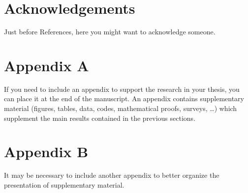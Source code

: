 \documentclass[11pt,a4paper]{article}
\begin{document}
\section*{Acknowledgements}
Just before References, here you might want to acknowledge someone.



\appendix
\section{Appendix A}
If you need to include an appendix to support the research in your thesis, you can place it at the end of the manuscript.
An appendix contains supplementary material (figures, tables, data, codes, mathematical proofs, surveys, \dots)
which supplement the main results contained in the previous sections.

\section{Appendix B}
It may be necessary to include another appendix to better organize the presentation of supplementary material.
\end{document}
